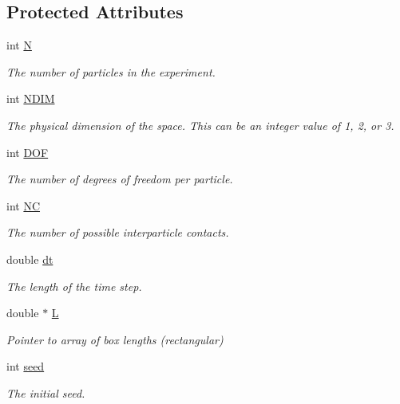 \subsection*{Protected Attributes}
\begin{DoxyCompactItemize}
\item 
int \mbox{\hyperlink{classpacking_a282fd04f2195ce1535ef9a1eb0c3af40}{N}}
\begin{DoxyCompactList}\small\item\em The number of particles in the experiment. \end{DoxyCompactList}\item 
int \mbox{\hyperlink{classpacking_a43d0d9d087ec30c847e89b5002e422d4}{N\+D\+IM}}
\begin{DoxyCompactList}\small\item\em The physical dimension of the space. This can be an integer value of 1, 2, or 3. \end{DoxyCompactList}\item 
int \mbox{\hyperlink{classpacking_a154fee4288694b65d28f5d904b1784b6}{D\+OF}}
\begin{DoxyCompactList}\small\item\em The number of degrees of freedom per particle. \end{DoxyCompactList}\item 
int \mbox{\hyperlink{classpacking_ad09604fb221c69596a95083c1c8c7d47}{NC}}
\begin{DoxyCompactList}\small\item\em The number of possible interparticle contacts. \end{DoxyCompactList}\item 
double \mbox{\hyperlink{classpacking_a61dd57ff727cdffa0573189b14a372d3}{dt}}
\begin{DoxyCompactList}\small\item\em The length of the time step. \end{DoxyCompactList}\item 
double $\ast$ \mbox{\hyperlink{classpacking_ae4a6707ea8b2af01eda36ea9d230259e}{L}}
\begin{DoxyCompactList}\small\item\em Pointer to array of box lengths (rectangular) \end{DoxyCompactList}\item 
int \mbox{\hyperlink{classpacking_aa5a588c50b2c22b3c2917a2da12f33e5}{seed}}
\begin{DoxyCompactList}\small\item\em The initial seed. \end{DoxyCompactList}\item 

\end{DoxyCompactItemize}
